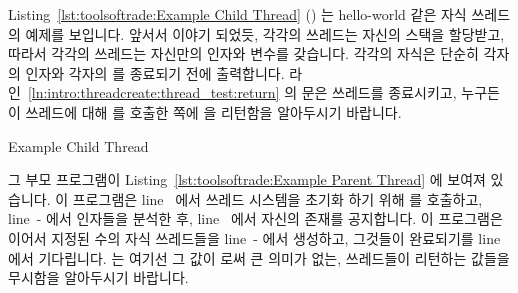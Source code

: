 Listing~\ref{lst:toolsoftrade:Example Child Thread} ()
는 hello-world 같은 자식 쓰레드의 예제를 보입니다.
앞서서 이야기 되었듯, 각각의 쓰레드는 자신의 스택을 할당받고, 따라서 각각의
쓰레드는 자신만의  인자와  변수를 갖습니다.
각각의 자식은 단순히 각자의 인자와 각자의  를 종료되기 전에
출력합니다.
라인~\ref{ln:intro:threadcreate:thread_test:return} 의  문은
쓰레드를 종료시키고, 누구든 이 쓰레드에 대해  를 호출한 쪽에
 을 리턴함을 알아두시기 바랍니다.

\begin{listing}[tbp]

\caption{Example Child Thread}
\label{lst:toolsoftrade:Example Child Thread}
\end{listing}

\begin{lineref}
그 부모 프로그램이
Listing~\ref{lst:toolsoftrade:Example Parent Thread}
에 보여져 있습니다.
이 프로그램은 line~ 에서 쓰레드 시스템을 초기화 하기 위해
 를 호출하고, line~- 에서 인자들을
분석한 후, line~ 에서 자신의 존재를 공지합니다.
이 프로그램은 이어서 지정된 수의 자식 쓰레드들을
line~- 에서 생성하고, 그것들이 완료되기를
line~ 에서 기다립니다.
 는 여기선 그 값이  로써 큰 의미가 없는,
쓰레드들이 리턴하는 값들을 무시함을 알아두시기 바랍니다.

\end{lineref}

